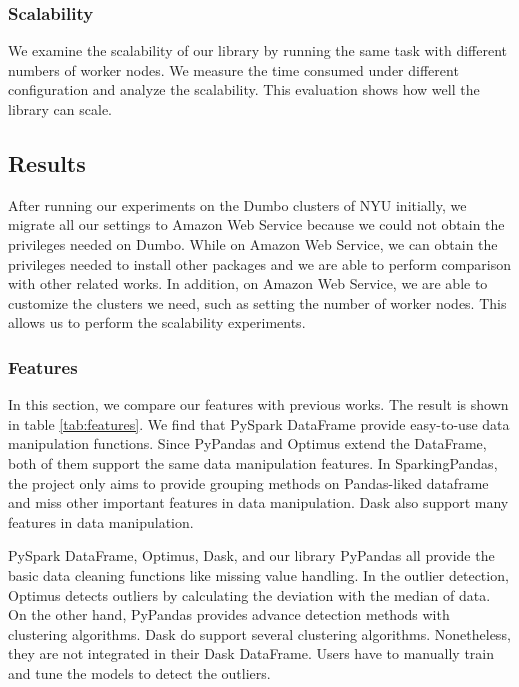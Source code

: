 \documentclass[sigconf]{acmart}
\begin{document}
\subsubsection{Scalability}
We examine the scalability of our library by running the same task with different numbers of worker nodes. We measure the time consumed under different configuration and analyze the scalability. This evaluation shows how well the library can scale.

\subsection{Results}
After running our experiments on the Dumbo clusters of NYU initially, we migrate all our settings to Amazon Web Service because we could not obtain the privileges needed on Dumbo. While on Amazon Web Service, we can obtain the privileges needed to install other packages and we are able to perform comparison with other related works. In addition, on Amazon Web Service, we are able to customize the clusters we need, such as setting the number of worker nodes. This allows us to perform the scalability experiments.

\subsubsection{Features}
In this section, we compare our features with previous works. The result is shown in table \ref{tab:features}. We find that PySpark DataFrame provide easy-to-use data manipulation functions. Since PyPandas and Optimus extend the DataFrame, both of them support the same data manipulation features. In SparkingPandas, the project only aims to provide grouping methods on Pandas-liked dataframe and miss other important features in data manipulation. Dask also support many features in data manipulation. 

PySpark DataFrame, Optimus, Dask, and our library PyPandas all provide the basic data cleaning functions like missing value handling. In the outlier detection, Optimus detects outliers by calculating the deviation with the median of data. On the other hand, PyPandas provides advance detection methods with clustering algorithms. Dask do support several clustering algorithms. Nonetheless, they are not integrated in their Dask DataFrame. Users have to manually train and tune the models to detect the outliers.
\end{document}
